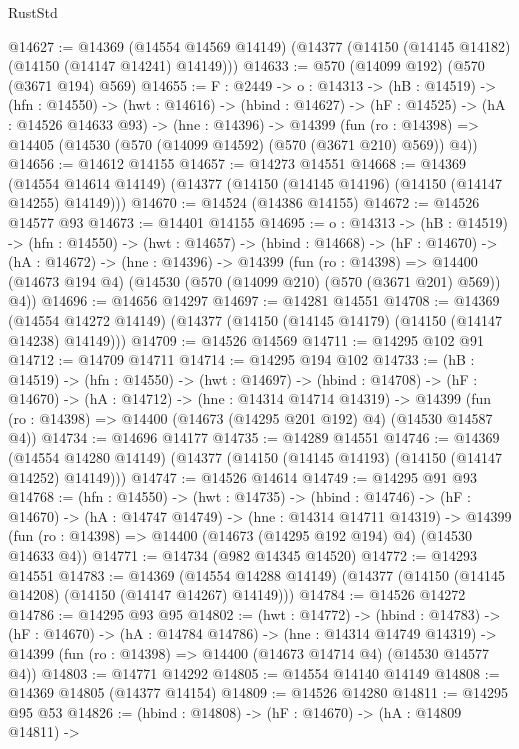 \begin{lexlean}{RustStd}
\begin{coremodule}
@14627 := @14369
    (@14554 @14569 @14149)
    (@14377 (@14150 (@14145 @14182) (@14150 (@14147 @14241) @14149)))
@14633 := @570 (@14099 @192) (@570 (@3671 @194) @569)
@14655 := {F : @2449} ->
  {o : @14313} ->
  (hB : @14519) ->
  (hfn : @14550) ->
  (hwt : @14616) ->
  (hbind : @14627) ->
  (hF : @14525) ->
  (hA : @14526 @14633 @93) ->
  (hne : @14396) ->
  @14399 (fun (ro : @14398) => @14405 (@14530 (@570 (@14099 @14592) (@570 (@3671 @210) @569)) @4))
@14656 := @14612 @14155
@14657 := @14273 @14551
@14668 := @14369
    (@14554 @14614 @14149)
    (@14377 (@14150 (@14145 @14196) (@14150 (@14147 @14255) @14149)))
@14670 := @14524 (@14386 @14155)
@14672 := @14526 @14577 @93
@14673 := @14401 @14155
@14695 := {o : @14313} ->
  (hB : @14519) ->
  (hfn : @14550) ->
  (hwt : @14657) ->
  (hbind : @14668) ->
  (hF : @14670) ->
  (hA : @14672) ->
  (hne : @14396) ->
  @14399
    (fun (ro : @14398) =>
    @14400 (@14673 @194 @4) (@14530 (@570 (@14099 @210) (@570 (@3671 @201) @569)) @4))
@14696 := @14656 @14297
@14697 := @14281 @14551
@14708 := @14369
    (@14554 @14272 @14149)
    (@14377 (@14150 (@14145 @14179) (@14150 (@14147 @14238) @14149)))
@14709 := @14526 @14569
@14711 := @14295 @102 @91
@14712 := @14709 @14711
@14714 := @14295 @194 @102
@14733 := (hB : @14519) ->
  (hfn : @14550) ->
  (hwt : @14697) ->
  (hbind : @14708) ->
  (hF : @14670) ->
  (hA : @14712) ->
  (hne : @14314 @14714 @14319) ->
  @14399 (fun (ro : @14398) => @14400 (@14673 (@14295 @201 @192) @4) (@14530 @14587 @4))
@14734 := @14696 @14177
@14735 := @14289 @14551
@14746 := @14369
    (@14554 @14280 @14149)
    (@14377 (@14150 (@14145 @14193) (@14150 (@14147 @14252) @14149)))
@14747 := @14526 @14614
@14749 := @14295 @91 @93
@14768 := (hfn : @14550) ->
  (hwt : @14735) ->
  (hbind : @14746) ->
  (hF : @14670) ->
  (hA : @14747 @14749) ->
  (hne : @14314 @14711 @14319) ->
  @14399 (fun (ro : @14398) => @14400 (@14673 (@14295 @192 @194) @4) (@14530 @14633 @4))
@14771 := @14734 (@982 @14345 @14520)
@14772 := @14293 @14551
@14783 := @14369
    (@14554 @14288 @14149)
    (@14377 (@14150 (@14145 @14208) (@14150 (@14147 @14267) @14149)))
@14784 := @14526 @14272
@14786 := @14295 @93 @95
@14802 := (hwt : @14772) ->
  (hbind : @14783) ->
  (hF : @14670) ->
  (hA : @14784 @14786) ->
  (hne : @14314 @14749 @14319) ->
  @14399 (fun (ro : @14398) => @14400 (@14673 @14714 @4) (@14530 @14577 @4))
@14803 := @14771 @14292
@14805 := @14554 @14140 @14149
@14808 := @14369 @14805 (@14377 @14154)
@14809 := @14526 @14280
@14811 := @14295 @95 @53
@14826 := (hbind : @14808) ->
  (hF : @14670) ->
  (hA : @14809 @14811) ->

\end{coremodule}
\end{lexlean}
